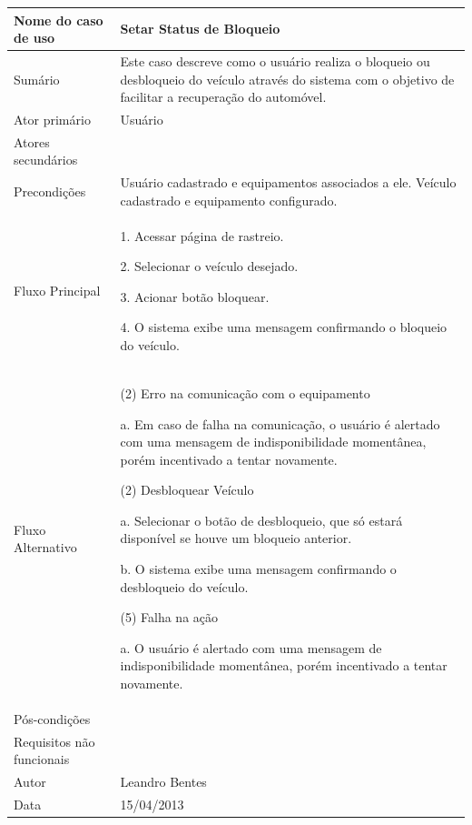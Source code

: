 \begin{flushleft}
\tablefirsthead{}
\tablehead{}
\tabletail{}
\tablelasttail{}
\begin{supertabular}{|m{5.5680003cm}|m{9.325cm}|}
\hline
Nome do caso de uso &
Setar Status de Bloqueio\\\hline
Sumário &
Este caso descreve como o usuário realiza o bloqueio ou desbloqueio do veículo através do sistema com o objetivo de facilitar a recuperação do automóvel. \\\hline
Ator primário &
Usuário\\\hline
Atores secundários &
~
\\\hline
Precondições &
Usuário cadastrado e equipamentos associados a ele. Veículo cadastrado e equipamento configurado.\\\hline
Fluxo Principal &
1. Acessar página de rastreio.

2. Selecionar o veículo desejado.

3. Acionar botão bloquear.

4. O sistema exibe uma mensagem confirmando o bloqueio do veículo.\\\hline
Fluxo Alternativo &
(2) Erro na comunicação com o equipamento

a. Em caso de falha na comunicação, o usuário é alertado com uma mensagem de indisponibilidade momentânea, porém incentivado a tentar novamente.

(2) Desbloquear Veículo

a. Selecionar o botão de desbloqueio, que só estará disponível se houve um bloqueio anterior.

b. O sistema exibe uma mensagem confirmando o desbloqueio do veículo.

(5) Falha na ação

a. O usuário é alertado com uma mensagem de indisponibilidade momentânea, porém incentivado a tentar novamente.\\\hline
Pós-condições &
~\\\hline
Requisitos não funcionais &
~\\\hline
Autor &
Leandro Bentes\\\hline
Data &
15/04/2013\\\hline
\end{supertabular}
\end{flushleft}

